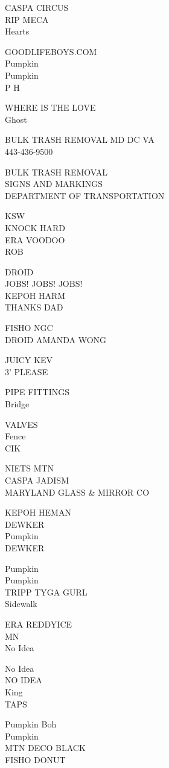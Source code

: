 \documentclass[10pt,letterpaper]{article}
\begin{document}
CASPA CIRCUS\\
RIP MECA\\
Hearts

GOODLIFEBOYS.COM\\
Pumpkin\\
Pumpkin\\
P H

WHERE IS THE LOVE\\
Ghost

BULK TRASH REMOVAL MD DC VA\\
443{-}436{-}9500

BULK TRASH REMOVAL\\
SIGNS AND MARKINGS\\
DEPARTMENT OF TRANSPORTATION

KSW\\
KNOCK HARD\\
ERA VOODOO\\
ROB

DROID\\
JOBS! JOBS! JOBS!\\
KEPOH HARM\\
THANKS DAD

FISHO NGC\\
DROID AMANDA WONG

JUICY KEV\\
3' PLEASE

PIPE FITTINGS\\
Bridge

VALVES\\
Fence\\
CIK

NIETS MTN\\
CASPA JADISM\\
MARYLAND GLASS \& MIRROR CO

KEPOH HEMAN\\
DEWKER\\
Pumpkin\\
DEWKER

Pumpkin\\
Pumpkin\\
TRIPP TYGA GURL\\
Sidewalk

ERA REDDYICE\\
MN\\
No Idea

No Idea\\
NO IDEA\\
King\\
TAPS

Pumpkin Boh\\
Pumpkin\\
MTN DECO BLACK\\
FISHO DONUT
\end{document}
